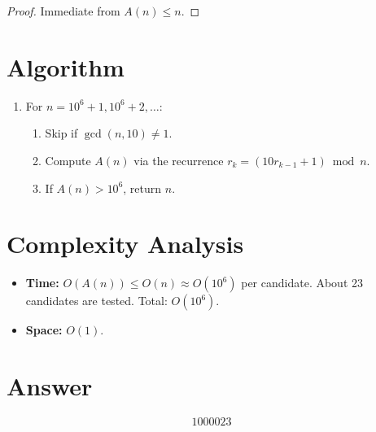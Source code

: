 \documentclass[11pt,a4paper]{article}
\begin{document}
\begin{proof}
Immediate from $A(n) \le n$.
\end{proof}

\section{Algorithm}

\begin{enumerate}
\item For $n = 10^6 + 1, 10^6 + 2, \ldots$:
\begin{enumerate}
\item Skip if $\gcd(n, 10) \ne 1$.
\item Compute $A(n)$ via the recurrence $r_k = (10 r_{k-1} + 1) \bmod n$.
\item If $A(n) > 10^6$, return $n$.
\end{enumerate}
\end{enumerate}

\section{Complexity Analysis}

\begin{itemize}
\item \textbf{Time:} $O(A(n)) \le O(n) \approx O(10^6)$ per candidate. About 23 candidates are tested. Total: $O(10^6)$.
\item \textbf{Space:} $O(1)$.
\end{itemize}

\section{Answer}

\[
\boxed{1000023}
\]
\end{document}
